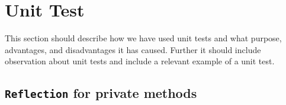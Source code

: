 \section{Unit Test}
This section should describe how we have used unit tests and what purpose, advantages, and disadvantages it has caused. Further it should include observation about unit tests and include a relevant example of a unit test.




\subsection{\texttt{Reflection} for private methods} 
